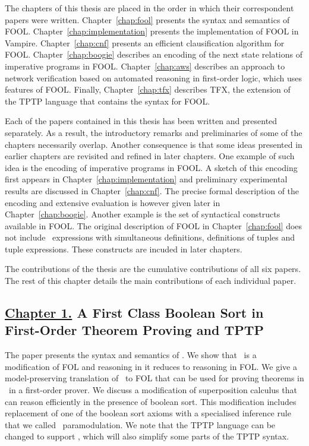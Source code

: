 The chapters of this thesis are placed in the order in which their correspondent papers were written. Chapter~\ref{chap:fool} presents the syntax and semantics of FOOL. Chapter~\ref{chap:implementation} presents the implementation of FOOL in Vampire. Chapter~\ref{chap:cnf} presents an efficient clausification algorithm for FOOL. Chapter~\ref{chap:boogie} describes an encoding of the next state relations of imperative programs in FOOL. Chapter~\ref{chap:aws} describes an approach to network verification based on automated reasoning in first-order logic, which uses features of FOOL. Finally, Chapter~\ref{chap:tfx} describes TFX, the extension of the TPTP language that contains the syntax for FOOL.

Each of the papers contained in this thesis has been written and presented separately. As a result, the introductory remarks and preliminaries of some of the chapters necessarily overlap. Another consequence is that some ideas presented in earlier chapters are revisited and refined in later chapters. One example of such idea is the encoding of imperative programs in FOOL. A sketch of this encoding first appears in Chapter~\ref{chap:implementation} and preliminary experimental results are discussed in Chapter~\ref{chap:cnf}. The precise formal description of the encoding and extensive evaluation is however given later in Chapter~\ref{chap:boogie}. Another example is the set of syntactical constructs available in FOOL. The original description of FOOL in Chapter~\ref{chap:fool} does not include \LETIN\ expressions with simultaneous definitions, definitions of tuples and tuple expressions. These constructs are incuded in later chapters.

The contributions of the thesis are the cumulative contributions of all six papers. The rest of this chapter details the main contributions of each individual paper.

\subsection*{\hyperref[chap:fool]{Chapter 1.} A First Class Boolean Sort in\\First-Order Theorem Proving and TPTP}
The paper presents the syntax and semantics of \folb. We show that \folb\ is a modification of FOL and reasoning in it reduces to reasoning in FOL. We give a model-preserving \iffalse(modulo introduced definitions)\fi translation of \folb\ to FOL that can be used for proving theorems in \folb\ in a first-order prover. We discuss a modification of superposition calculus that can reason efficiently in the presence of boolean sort. This modification includes replacement of one of the boolean sort axioms with a specialised inference rule that we called \folb\ paramodulation. We note that the TPTP language can be changed to support \folb, which will also simplify some parts of the TPTP syntax. 

